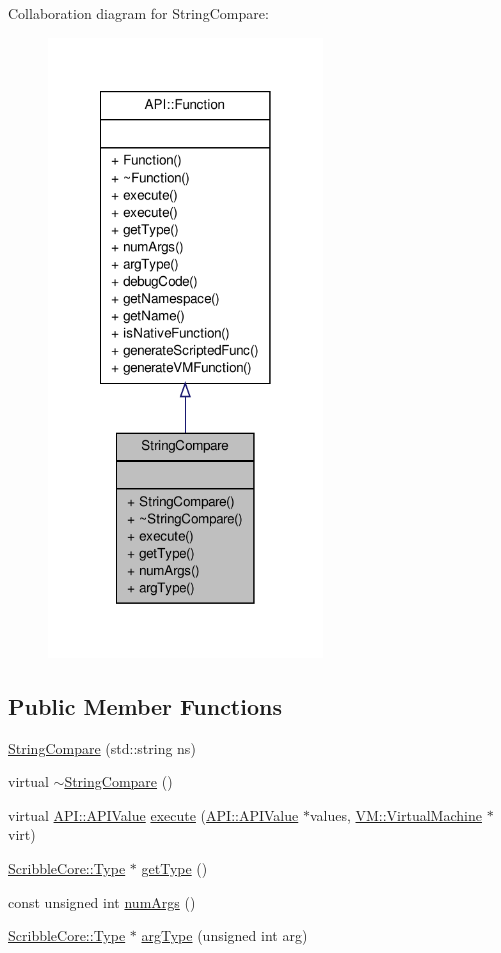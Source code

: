 Collaboration diagram for String\-Compare\-:
\nopagebreak
\begin{figure}[H]
\begin{center}
\leavevmode
\includegraphics[width=206pt]{class_string_compare__coll__graph}
\end{center}
\end{figure}
\subsection*{Public Member Functions}
\begin{DoxyCompactItemize}
\item 
\hyperlink{class_string_compare_a15377e5b3d9097b1741d4fa83f6c7088}{String\-Compare} (std\-::string ns)
\item 
virtual \hyperlink{class_string_compare_a4b5991631776cc82724bdc43b0ae36b8}{$\sim$\-String\-Compare} ()
\item 
virtual \hyperlink{class_a_p_i_1_1_a_p_i_value}{A\-P\-I\-::\-A\-P\-I\-Value} \hyperlink{class_string_compare_a6a901a2673154898ec8719489693ce92}{execute} (\hyperlink{class_a_p_i_1_1_a_p_i_value}{A\-P\-I\-::\-A\-P\-I\-Value} $\ast$values, \hyperlink{class_v_m_1_1_virtual_machine}{V\-M\-::\-Virtual\-Machine} $\ast$virt)
\item 
\hyperlink{class_scribble_core_1_1_type}{Scribble\-Core\-::\-Type} $\ast$ \hyperlink{class_string_compare_a05f48854b4a9568bf91d200a9dd84338}{get\-Type} ()
\item 
const unsigned int \hyperlink{class_string_compare_a77a56b8591d226bf30a4ae3a91feab32}{num\-Args} ()
\item 
\hyperlink{class_scribble_core_1_1_type}{Scribble\-Core\-::\-Type} $\ast$ \hyperlink{class_string_compare_a9d9d35842beead78a0130f68012ac378}{arg\-Type} (unsigned int arg)
\end{DoxyCompactItemize}
